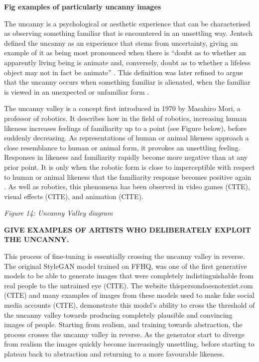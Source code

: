 \textbf{Fig examples of particularly uncanny images}

The uncanny is a psychological or aesthetic experience that can be characterised as observing something familiar that is encountered in an unsettling way. 
Jentsch defined the uncanny as an experience that stems from uncertainty, giving an example of it as being most pronounced when there is “doubt as to whether an apparently living being is animate and, conversely, doubt as to whether a lifeless object may not in fact be animate” \citep{jentsch1997psychology}. 
This definition was later refined to argue that the uncanny occurs when something familiar is alienated, when the familiar is viewed in an unexpected or unfamiliar form \citep{freud1919uncanny}.

The uncanny valley is a concept first introduced in 1970 by Masahiro Mori, a professor of robotics. 
It describes how in the field of robotics, increasing human likeness increases feelings of familiarity up to a point (see Figure below), before suddenly decreasing. 
As representations of human or animal likeness approach a close resemblance to human or animal form, it provokes an unsettling feeling. 
Responses in likeness and familiarity rapidly become more negative than at any prior point. 
It is only when the robotic form is close to imperceptible with respect to human or animal likeness that the familiarity response becomes positive again \citep{mori1970uncanny}. 
As well as robotics, this phenomena has been observed in video games (CITE), visual effects (CITE), and animation (CITE). 

\textit{Figure 14: Uncanny Valley diagram}

\textbf{GIVE EXAMPLES OF ARTISTS WHO DELIBERATELY EXPLOIT THE UNCANNY.}

This process of fine-tuning is essentially crossing the uncanny valley in reverse.
The original StyleGAN model trained on FFHQ, was one of the first generative models to be able to generate images that were completely indistinguishable from real people to the untrained eye (CITE). 
The website thispersondoesnotexist.com (CITE) and many examples of images from these models used to make fake social media accounts (CITE), demonstrate this model's ability to cross the threshold of the uncanny valley towards producing completely plausible and convincing images of people.
Starting from realism, and training towards abstraction, the process crosses the uncanny valley in reverse. 
As the generator start to diverge from realism the images quickly become increasingly unsettling, before starting to plateau back to abstraction and returning to a more favourable likeness.

